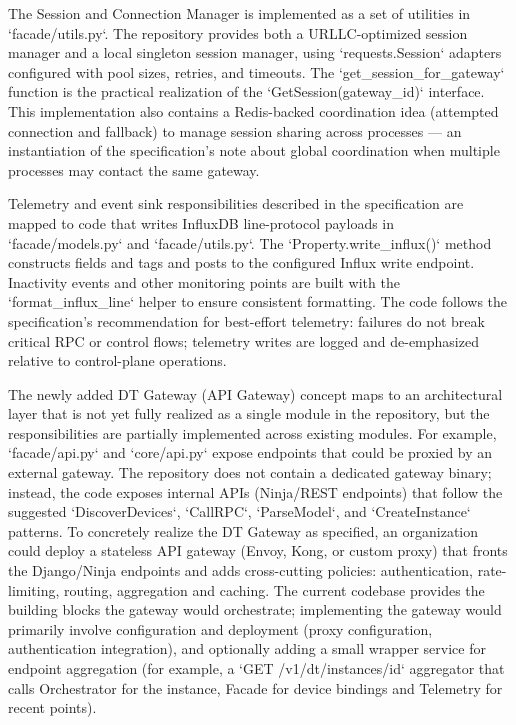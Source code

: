 \documentclass[11pt,a4paper]{article}
\begin{document}
The Session and Connection Manager is implemented as a set of utilities in `facade/utils.py`. The repository provides both a URLLC-optimized session manager and a local singleton session manager, using `requests.Session` adapters configured with pool sizes, retries, and timeouts. The `get_session_for_gateway` function is the practical realization of the `GetSession(gateway_id)` interface. This implementation also contains a Redis-backed coordination idea (attempted connection and fallback) to manage session sharing across processes — an instantiation of the specification's note about global coordination when multiple processes may contact the same gateway.

Telemetry and event sink responsibilities described in the specification are mapped to code that writes InfluxDB line-protocol payloads in `facade/models.py` and `facade/utils.py`. The `Property.write_influx()` method constructs fields and tags and posts to the configured Influx write endpoint. Inactivity events and other monitoring points are built with the `format_influx_line` helper to ensure consistent formatting. The code follows the specification's recommendation for best-effort telemetry: failures do not break critical RPC or control flows; telemetry writes are logged and de-emphasized relative to control-plane operations.

The newly added DT Gateway (API Gateway) concept maps to an architectural layer that is not yet fully realized as a single module in the repository, but the responsibilities are partially implemented across existing modules. For example, `facade/api.py` and `core/api.py` expose endpoints that could be proxied by an external gateway. The repository does not contain a dedicated gateway binary; instead, the code exposes internal APIs (Ninja/REST endpoints) that follow the suggested `DiscoverDevices`, `CallRPC`, `ParseModel`, and `CreateInstance` patterns. To concretely realize the DT Gateway as specified, an organization could deploy a stateless API gateway (Envoy, Kong, or custom proxy) that fronts the Django/Ninja endpoints and adds cross-cutting policies: authentication, rate-limiting, routing, aggregation and caching. The current codebase provides the building blocks the gateway would orchestrate; implementing the gateway would primarily involve configuration and deployment (proxy configuration, authentication integration), and optionally adding a small wrapper service for endpoint aggregation (for example, a `GET /v1/dt/instances/{id}` aggregator that calls Orchestrator for the instance, Facade for device bindings and Telemetry for recent points).
\end{document}

